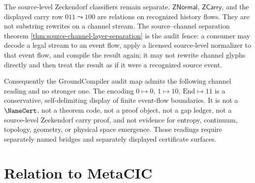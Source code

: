 The source-level Zeckendorf classifiers remain separate. $\mathsf{ZNormal}$,
$\mathsf{ZCarry}$, and the displayed carry row $011\leadsto 100$ are relations
on recognized history flows. They are not substring rewrites on a channel
stream. The source--channel separation theorem
\autoref{thm:source-channel-layer-separation} is the audit fence: a consumer
may decode a legal stream to an event flow, apply a licensed source-level
normalizer to that event flow, and compile the result again; it may not
rewrite channel glyphs directly and then treat the result as if it were a
recognized source event.

Consequently the GroundCompiler audit map admits the following channel
reading and no stronger one. The encoding $0\mapsto 0$, $1\mapsto 10$,
$\mathrm{End}\mapsto 11$ is a conservative, self-delimiting display of
finite event-flow boundaries. It is not a $\NameCert$, not a theorem code, not
a proof object, not a gap ledger, not a source-level Zeckendorf carry proof,
and not evidence for entropy, continuum, topology, geometry, or physical
space emergence. Those readings require separately named bridges and
separately displayed certificate surfaces.


\section{Relation to MetaCIC}
\label{sec:bedc-groundcompiler-audit-map-relation-to-metacic}

